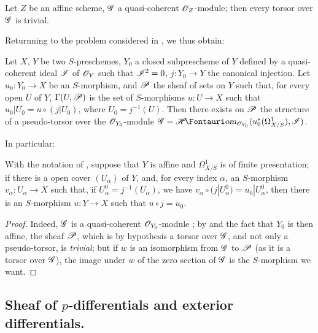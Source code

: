 \begin{proposition}[16.5.16]
\label{IV.16.5.16}
Let $Z$ be an affine scheme, $\mathscr{G}$ a quasi-coherent $\mathscr{O}_Z$-module;
then every torsor over $\mathscr{G}$ is trivial.
\end{proposition}

Returnning to the problem considered in , we thus obtain:

\begin{proposition}[16.5.17]
\label{IV.16.5.17}
Let $X$, $Y$ be two $S$-preschemes, $Y_0$ a closed subprescheme of $Y$ defined by a quasi-coherent ideal $\mathscr{I}$ of $\mathscr{O}_Y$ such that $\mathscr{I}^2 = 0$, $j : Y_0 \to Y$ the canonical injection.
Let $u_0:Y_0 \to X$ be an $S$-morphism, and $\mathscr{P}$ the sheaf of sets on $Y$ such that, for every open $U$ of $Y$, $\Gamma(U, \mathscr{P})$ is the set of $S$-morphisms $u : U \to X$ such that $u_0|U_0 = u \circ (j|U_0)$, where $U_0 = j^{-1}(U)$.
Then there exists on $\mathscr{P}$ the structure of a pseudo-torsor over the $\mathscr{O}_{Y_0}$-module $\sh{G} = \shHom_{\sh{O}_{Y_0}}(u_0^*(\Omega_{X/S}^1), \sh{I})$.
\end{proposition}

In particular:

\begin{corollary}[16.5.18]
\label{IV.16.5.18}
With the notation of , suppose that $Y$ is affine and $\Omega_{X/S}^1$ is of finite presentation;
if there is a open cover $(U_\alpha)$ of $Y$, and, for every index $\alpha$, an $S$-morphism $v_\alpha : U_\alpha \to X$ such that, if $U_\alpha^0 = j^{-1}(U_\alpha)$, we have $v_\alpha \circ (j|U_\alpha^0) = u_0|U_\alpha^0$, then there is an $S$-morphism $u : Y \to X$ such that $u \circ j = u_0$.
\end{corollary}

\begin{proof}
Indeed, $\mathscr{G}$ is a quasi-coherent $\mathscr{O}_{Y_0}$-module ;
by  and the fact that $Y_0$ is then affine, the sheaf $\mathscr{P}$, which is by hypothesis a torsor over $\mathscr{G}$, and not only a pseudo-torsor, is \emph{trivial};
but if $w$ is an isomorphism from $\mathscr{G}$ to $\mathscr{P}$ (as it is a torsor over $\mathscr{G}$), the image under $w$ of the zero section of $\mathscr{G}$ is the $S$-morphism we want.
\end{proof}

\subsection{Sheaf of $p$-differentials and exterior differentials.}
\label{IV.16.5}

